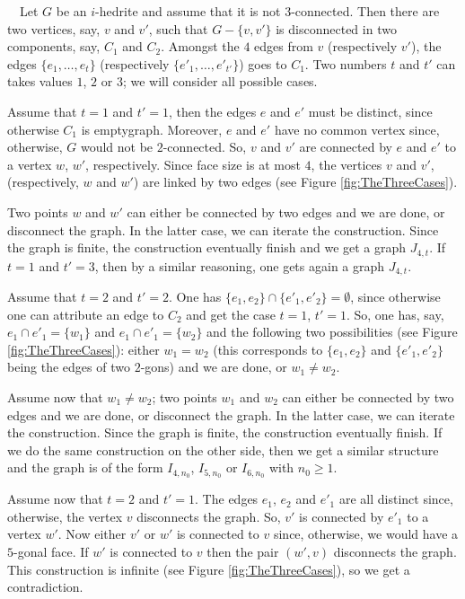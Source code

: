 \documentclass[12pt]{article}
\newcommand{\proof}{\noindent{\bf Proof.}\ \ }
\begin{document}
\proof Let $G$ be an $i$-hedrite and assume that it is not $3$-connected. 
Then there are two vertices, say, $v$ and $v'$, such that 
$G-\{v, v'\}$ is disconnected in two components, say, $C_1$ and $C_2$.
Amongst the $4$ edges from $v$ (respectively $v'$), the edges 
$\{e_1,\dots, e_{t}\}$ (respectively $\{e'_1,\dots, e'_{t'}\}$) goes
to $C_1$. Two numbers $t$ and $t'$ can takes values $1$, $2$ or $3$; we
will consider all possible cases.

Assume that $t=1$ and $t'=1$, then the edges $e$ and $e'$ must be
distinct, since otherwise $C_1$ is emptygraph. Moreover, $e$ and $e'$ have
no common vertex since, otherwise, $G$ would not be $2$-connected.
So, $v$ and $v'$ are connected by $e$ and $e'$ to a vertex $w$, $w'$,
respectively. Since face size is at most $4$, the vertices $v$ and $v'$,
(respectively, $w$ and $w'$) are linked by two edges
(see Figure \ref{fig:TheThreeCases}).

Two points $w$ and $w'$ can either be connected by two edges and
we are done, or disconnect the graph. In the latter case, we can iterate
the construction. Since the graph is finite, the construction eventually
finish and we get a graph $J_{4,t}$. If $t=1$ and
$t'=3$, then by a similar reasoning, one gets again a graph $J_{4,t}$.

Assume that $t=2$ and $t'=2$. One has $\{e_1, e_2\}\cap \{e'_1, e'_2\}=\emptyset$, since otherwise one can attribute an edge to $C_2$ and get the case
$t=1$, $t'=1$. So, one has, say, $e_1\cap e'_1=\{w_1\}$ and 
$e_1\cap e'_1=\{w_2\}$ and the following two possibilities 
(see Figure \ref{fig:TheThreeCases}): either $w_1=w_2$ (this
corresponds to $\{e_1, e_2\}$ and $\{e'_1, e'_2\}$ being the edges
of two $2$-gons) and we are done, or $w_1\not= w_2$.

Assume now that $w_1\not= w_2$; two points $w_1$ and $w_2$ can 
either be connected by two edges and we are done, or disconnect the
graph. In the latter case, we can iterate the construction. Since the 
graph is finite, the construction eventually finish. If we do the same
construction on the other side, then we get a similar structure and the 
graph is of the form $I_{4,n_0}$, $I_{5, n_0}$ or $I_{6,n_0}$ with 
$n_0\geq 1$.


Assume now that $t=2$ and $t'=1$. The edges $e_1$, $e_2$ and $e'_1$ are
all distinct since, otherwise, the vertex $v$ disconnects the graph.
So, $v'$ is connected by $e'_1$ to a vertex $w'$. Now either $v'$ or $w'$
is connected to $v$ since, otherwise, we would have a $5$-gonal face.
If $w'$ is connected to $v$ then the pair $(w', v)$ disconnects the graph.
This construction is infinite (see Figure \ref{fig:TheThreeCases}), so
we get a contradiction.
\end{document}
